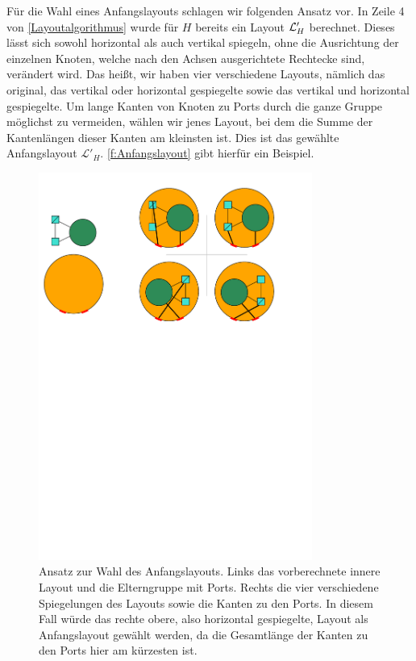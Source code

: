 Für die Wahl eines Anfangslayouts schlagen wir folgenden Ansatz vor.
In Zeile 4 von \autoref{Layoutalgorithmus} wurde für $H$ bereits ein Layout $\mathcal{L}'_H$ berechnet. 
Dieses lässt sich sowohl horizontal als auch vertikal spiegeln, ohne die Ausrichtung der einzelnen Knoten, welche nach den Achsen ausgerichtete Rechtecke sind, verändert wird.
Das heißt, wir haben vier verschiedene Layouts, nämlich das original, das vertikal oder horizontal gespiegelte sowie das vertikal und horizontal gespiegelte.
Um lange Kanten von Knoten zu Ports durch die ganze Gruppe möglichst zu vermeiden, wählen wir jenes Layout,
bei dem die Summe der Kantenlängen dieser Kanten am kleinsten ist. Dies ist das gewählte Anfangslayout $\mathcal{L}'_H$.
\autoref{f:Anfangslayout} gibt hierfür ein Beispiel.

\begin{figure}[t]%
\begin{center} 
  \includegraphics[width=0.8\textwidth]{Pics/Anfangslayout.pdf}
  \caption{Ansatz zur Wahl des Anfangslayouts. Links das vorberechnete innere Layout und die Elterngruppe mit Ports. Rechts die vier verschiedene Spiegelungen des Layouts sowie die Kanten zu den Ports.
  In diesem Fall würde das rechte obere, also horizontal gespiegelte, Layout als Anfangslayout gewählt werden, da die Gesamtlänge der Kanten zu den Ports hier am kürzesten ist.}
  \label{f:Anfangslayout}
\end{center}
\end{figure}



